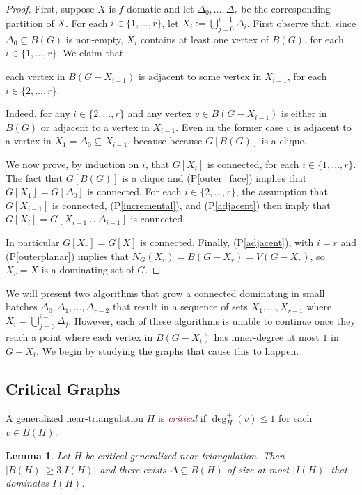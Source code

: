 \documentclass[12pt]{article}
\newcommand{\pref}[1]{(P\ref{#1})}
\newtheorem{lem}{Lemma}
\newcommand{\defin}[1]{\emph{\textcolor{Maroon}{#1}}}
\begin{document}
\begin{proof}
  First, suppose $X$ is $f$-domatic and let $\Delta_0,\ldots,\Delta_r$ be the corresponding partition of $X$.  For each $i\in\{1,\ldots,r\}$, let $X_i:=\bigcup_{j=0}^{i-1} \Delta_i$.  First observe that, since $\Delta_0\subseteq B(G)$ is non-empty, $X_i$ contains at least one vertex of $B(G)$, for each $i\in\{1,\ldots,r\}$. We claim that
  \begin{compactenum}[(P1)]\setcounter{enumi}{3}
    \item each vertex in $B(G-X_{i-1})$ is adjacent to some vertex in $X_{i-1}$, for each $i\in\{2,\ldots,r\}$. \label{adjacent}
  \end{compactenum}
  Indeed, for any $i\in\{2,\ldots,r\}$ and any vertex $v\in B(G-X_{i-1})$ is either in $B(G)$ or adjacent to a vertex in $X_{i-1}$. Even in the former case $v$ is adjacent to a vertex in $X_1=\Delta_0\subseteq X_{i-1}$, because because $G[B(G)]$ is a clique.

  We now prove, by induction on $i$, that $G[X_i]$ is connected, for each $i\in\{1,\ldots,r\}$.
  The fact that $G[B(G)]$ is a clique and \pref{outer_face} implies that $G[X_1]=G[\Delta_0]$ is connected. For each $i\in\{2,\ldots,r\}$, the assumption that $G[X_{i-1}]$ is connected, \pref{incremental}, and \pref{adjacent} then imply that $G[X_i]=G[X_{i-1}\cup\Delta_{i-1}]$ is connected.

  In particular $G[X_r]=G[X]$ is connected.  Finally, \pref{adjacent}, with $i=r$ and \pref{outerplanar} implies that $N_G(X_r)=B(G-X_r)=V(G-X_r)$, so $X_r=X$ is a dominating set of $G$.
\end{proof}

We will present two algorithms that grow a connected dominating in small batches $\Delta_0,\Delta_1,\ldots,\Delta_{r-2}$ that result in a sequence of sets $X_1,\ldots,X_{r-1}$ where $X_{i}=\bigcup_{j=0}^{i-1}\Delta_j$.  However, each of these algorithms is unable to continue once they reach a point where each vertex in $B(G-X_i)$ has inner-degree at most $1$ in $G-X_i$.  We begin by studying the graphs that cause this to happen.

\subsection{Critical Graphs}

A generalized near-triangulation $H$ is \defin{critical} if $\deg^+_H(v)\le 1$ for each $v\in B(H)$.


\begin{lem}\label{base_case}
    Let $H$ be critical generalized near-triangulation. Then $|B(H)|\ge 3|I(H)|$ and there exists $\Delta\subseteq B(H)$ of size at most $|I(H)|$ that dominates $I(H)$.
\end{lem}
\end{document}
